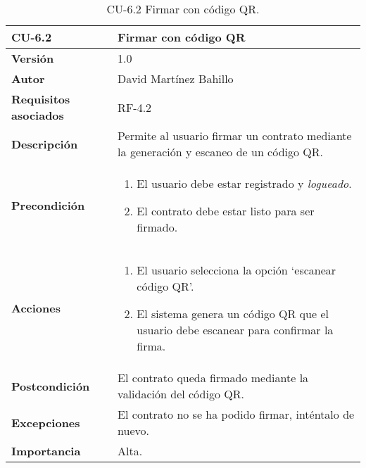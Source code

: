 \begin{table}[p]
	\centering
	\begin{tabularx}{\linewidth}{ p{} p{} }
		\toprule
		\textbf{CU-6.2}  & \textbf{Firmar con código QR}\\
		\midrule
		\textbf{Versión}              & 1.0    \\
		\textbf{Autor}                & David Martínez Bahillo \\
		\textbf{Requisitos asociados} & RF-4.2 \\
		\textbf{Descripción}          & Permite al usuario firmar un contrato mediante la generación y escaneo de un código QR. \\
		\textbf{Precondición}         &  
		\begin{enumerate}
			\def\labelenumi{\arabic{enumi}.}
			\tightlist
			\item El usuario debe estar registrado y \textit{logueado}.
			\item El contrato debe estar listo para ser firmado.
		\end{enumerate}\\
		\textbf{Acciones}             &
		\begin{enumerate}
			\def\labelenumi{\arabic{enumi}.}
			\tightlist
			\item El usuario selecciona la opción `escanear código QR'.
			\item El sistema genera un código QR que el usuario debe escanear para confirmar la firma.
		\end{enumerate}\\
		\textbf{Postcondición}        & El contrato queda firmado mediante la validación del código QR. \\
		\textbf{Excepciones}          & El contrato no se ha podido firmar, 
		inténtalo de nuevo. \\
		\textbf{Importancia}          & Alta.  \\
		\bottomrule
	\end{tabularx}
	\caption{CU-6.2 Firmar con código QR.}
\end{table}


